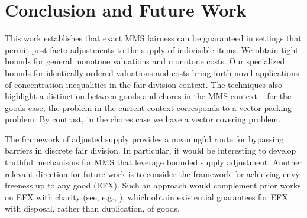 \section{Conclusion and Future Work}
This work establishes that exact MMS fairness can be guaranteed in settings that permit post facto adjustments to the supply of indivisible items. We obtain tight bounds for general monotone valuations and monotone costs. Our specialized bounds for identically ordered valuations and costs bring forth novel applications of concentration inequalities in the fair division context. The techniques also highlight a distinction between goods and chores in the MMS context -- for the goods case, the problem in the current context corresponds to a vector packing problem. By contrast, in the chores case we have a vector covering problem.   

The framework of adjusted supply provides a meaningful route for bypassing barriers in discrete fair division. In particular, it would be interesting to develop truthful mechanisms for MMS that leverage bounded supply adjustment. Another relevant direction for future work is to consider the framework for achieving envy-freeness up to any good (EFX). Such an approach would complement prior works on EFX with charity (see, e.g., \cite{chaudhury2021little}), which obtain existential guarantees for EFX with disposal, rather than duplication, of goods.